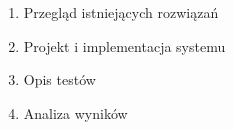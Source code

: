 \begin{enumerate}
 \item Przegląd istniejących rozwiązań
 \item Projekt i implementacja systemu
 \item Opis testów
 \item Analiza wyników
\end{enumerate}
